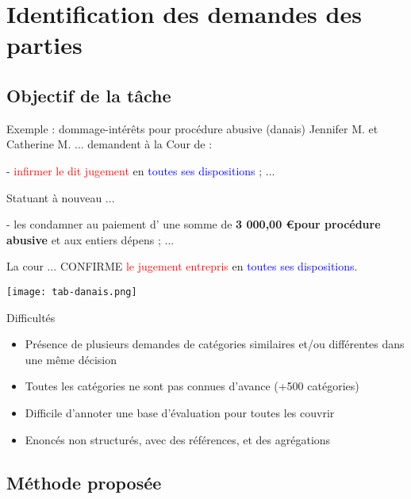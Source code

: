 \section{Identification des demandes des parties}
\subsection{Objectif de la tâche}
\begin{frame}[t]{\mysubsectiontitle}
\begin{exampleblock}{\scriptsize Exemple : dommage-intérêts pour procédure abusive (danais)}
	\scriptsize
	Jennifer M. et Catherine M. ... demandent à la Cour de :
	
	- \textcolor{red}{infirmer le dit jugement} en \textcolor{blue}{toutes ses dispositions} ; 
	...
	
	Statuant à nouveau ...
	
	- les condamner au paiement d' une somme de  \textbf{3 000,00 \euro pour procédure abusive} et
	aux entiers dépens ; ...
	
	La cour ... CONFIRME \textcolor{red}{le jugement entrepris} en \textcolor{blue}{toutes ses dispositions}.
	
	\centering \texttt{[image: tab-danais.png]}
\end{exampleblock}

\begin{alertblock}{\scriptsize Difficultés}
	\begin{itemize}\scriptsize 
		\item Présence de plusieurs demandes de catégories similaires et/ou différentes dans une même décision
		\item Toutes les catégories ne sont pas connues d'avance (+500 catégories)
		\item Difficile d'annoter une base d'évaluation pour toutes les couvrir
		\item Enoncés non structurés, avec des références, et des agrégations
	\end{itemize}
\end{alertblock}
\end{frame}

\subsection{Méthode proposée}

